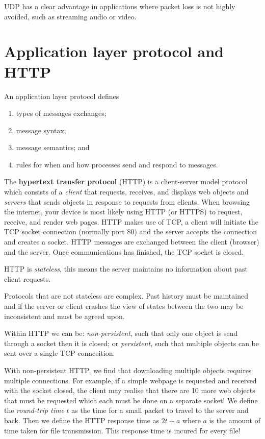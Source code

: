 UDP has a clear advantage in applications where packet loss is not highly avoided, such as streaming audio or video.

\section{Application layer protocol and HTTP}

An application layer protocol defines 
\begin{enumerate}
    \item types of messages exchanges;
    \item message syntax;
    \item message semantics; and
    \item rules for when and how processes send and respond to messages.
\end{enumerate}

The \textbf{hypertext transfer protocol} (HTTP) is a client-server model protocol which consists of a \emph{client} that requests, receives, and displays web objects and \emph{servers} that sends objects in response to requests from clients. 
When browsing the internet, your device is most likely using HTTP (or HTTPS) to request, receive, and render web pages. 
HTTP makes use of TCP, a client will initiate the TCP socket connection (normally port 80) and the server accepts the connection and creates a socket. 
HTTP messages are exchanged between the client (browser) and the server.
Once communications has finished, the TCP socket is closed.

HTTP is \emph{stateless}, this means the server maintains no information about past client requests.

\begin{remark}
    Protocols that are not stateless are complex. 
    Past history must be maintained and if the server  or client crashes the view of states between the two may be inconsistent and must be agreed upon.
\end{remark}

Within HTTP we can be: \emph{non-persistent}, such that only one object is send through a socket then it is closed; or \emph{persistent}, such that multiple objects can be sent over a single TCP connecition. 

With non-persistent HTTP, we find that downloading multiple objects requires multiple connections. 
For example, if a simple webpage is requested and received with the socket closed, the client may realise that there are 10 more web objects that must be requested which each must be done on a separate socket! 
We define the \emph{round-trip time} $t$ as the time for a small packet to travel to the server and back. 
Then we define the HTTP response time as $2t + a$ where $a$ is the amount of time taken for file transmission. 
This response time is incured for every file!

